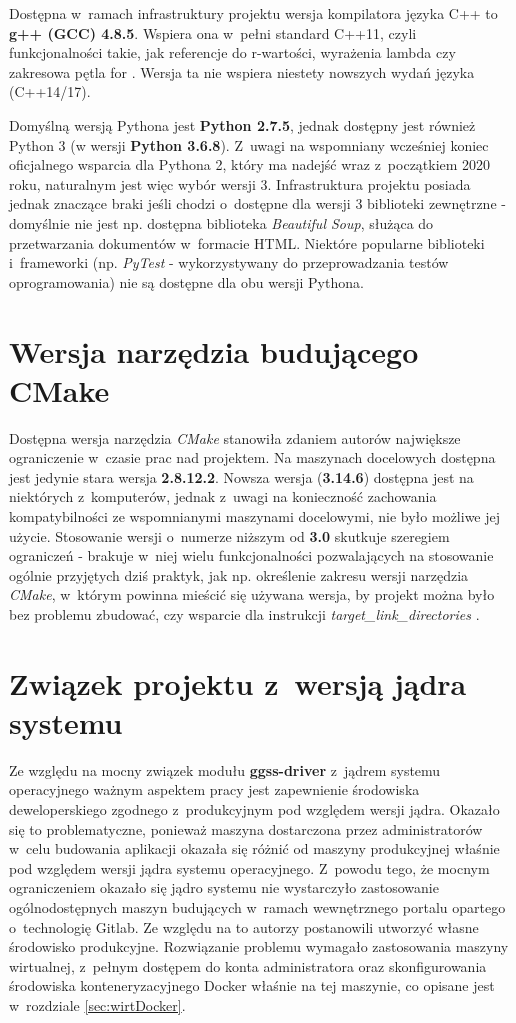 Dostępna w~ramach infrastruktury projektu wersja kompilatora języka C++ to \textbf{g++ (GCC) 4.8.5}. Wspiera ona w~pełni standard C++11, czyli funkcjonalności takie, jak referencje do r-wartości, wyrażenia lambda czy zakresowa pętla for \cite{GCC48}. Wersja ta nie wspiera niestety nowszych wydań języka (C++14/17). \par

Domyślną wersją Pythona jest \textbf{Python 2.7.5}, jednak dostępny jest również Python 3 (w wersji \textbf{Python 3.6.8}). Z~uwagi na wspomniany wcześniej koniec oficjalnego wsparcia dla Pythona 2, który ma nadejść wraz z~początkiem 2020 roku, naturalnym jest więc wybór wersji 3. Infrastruktura projektu posiada jednak znaczące braki jeśli chodzi o~dostępne dla wersji 3 biblioteki zewnętrzne - domyślnie nie jest np. dostępna biblioteka \textit{Beautiful Soup}, służąca do przetwarzania dokumentów w~formacie HTML. Niektóre popularne biblioteki i~frameworki (np. \textit{PyTest} - wykorzystywany do przeprowadzania testów oprogramowania) nie są dostępne dla obu wersji Pythona.

\section{Wersja narzędzia budującego CMake}
Dostępna wersja narzędzia \textit{CMake} stanowiła zdaniem autorów największe ograniczenie w~czasie prac nad projektem. Na maszynach docelowych dostępna jest jedynie stara wersja \textbf{2.8.12.2}. Nowsza wersja (\textbf{3.14.6}) dostępna jest na niektórych z~komputerów, jednak z~uwagi na konieczność zachowania kompatybilności ze wspomnianymi maszynami docelowymi, nie było możliwe jej użycie. Stosowanie wersji o~numerze niższym od \textbf{3.0} skutkuje szeregiem ograniczeń - brakuje w~niej wielu funkcjonalności pozwalających na stosowanie ogólnie przyjętych dziś praktyk, jak np. określenie zakresu wersji narzędzia \textit{CMake}, w~którym powinna mieścić się używana wersja, by projekt można było bez problemu zbudować, czy wsparcie dla instrukcji \textit{target\_link\_directories} \cite{NewInCMake}.

\section{Związek projektu z~wersją jądra systemu}
Ze względu na mocny związek modułu \textbf{ggss-driver} z~jądrem systemu operacyjnego ważnym aspektem pracy jest zapewnienie środowiska deweloperskiego zgodnego z~produkcyjnym pod względem wersji jądra. Okazało się to problematyczne, ponieważ maszyna dostarczona przez administratorów w~celu budowania aplikacji okazała się różnić od maszyny produkcyjnej właśnie pod względem wersji jądra systemu operacyjnego. Z~powodu tego, że mocnym ograniczeniem okazało się jądro systemu nie wystarczyło zastosowanie ogólnodostępnych maszyn budujących w~ramach wewnętrznego portalu opartego o~technologię Gitlab. Ze względu na to autorzy postanowili utworzyć własne środowisko produkcyjne. Rozwiązanie problemu wymagało zastosowania maszyny wirtualnej, z~pełnym dostępem do konta administratora oraz skonfigurowania środowiska konteneryzacyjnego Docker właśnie na tej maszynie, co opisane jest w~rozdziale \ref{sec:wirtDocker}.


